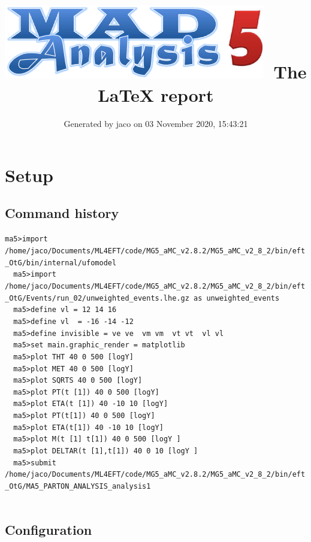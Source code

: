 \documentclass[a4paper, 10pt]{article}
\title{{\includegraphics[scale=.4]{logo.png}}\ The LaTeX report}
\author{Generated by jaco on 03 November 2020, 15:43:21}
\begin{document}
\maketitle
\flushbottom

\newpage
\section{ Setup}

\subsection{ Command history}

\texttt{ma5>import /\-home/\-jaco/\-Documents/\-ML4EFT/\-code/\-MG5\_aMC\_v2.8.2/\-MG5\_aMC\_v2\_8\_2/\-bin/\-eft\_OtG/\-bin/\-internal/\-ufomodel\\
}
\texttt{ }\texttt{ }\texttt{ma5>import /\-home/\-jaco/\-Documents/\-ML4EFT/\-code/\-MG5\_aMC\_v2.8.2/\-MG5\_aMC\_v2\_8\_2/\-bin/\-eft\_OtG/\-Events/\-run\_02/\-unweighted\_events.lhe.gz as unweighted\_events\\
}
\texttt{ }\texttt{ }\texttt{ma5>define vl = 12 14 16\\
}
\texttt{ }\texttt{ }\texttt{ma5>define vl~ = -16 -14 -12\\
}
\texttt{ }\texttt{ }\texttt{ma5>define invisible = ve ve~ vm vm~ vt vt~ vl vl~\\
}
\texttt{ }\texttt{ }\texttt{ma5>set main.graphic\_render = matplotlib\\
}
\texttt{ }\texttt{ }\texttt{ma5>plot THT   40 0 500 [logY]\\
}
\texttt{ }\texttt{ }\texttt{ma5>plot MET   40 0 500 [logY]\\
}
\texttt{ }\texttt{ }\texttt{ma5>plot SQRTS 40 0 500 [logY]\\
}
\texttt{ }\texttt{ }\texttt{ma5>plot  PT(t~[1]) 40 0  500 [logY]\\
}
\texttt{ }\texttt{ }\texttt{ma5>plot ETA(t~[1]) 40 -10 10 [logY]\\
}
\texttt{ }\texttt{ }\texttt{ma5>plot  PT(t[1]) 40 0  500 [logY]\\
}
\texttt{ }\texttt{ }\texttt{ma5>plot ETA(t[1]) 40 -10 10 [logY]\\
}
\texttt{ }\texttt{ }\texttt{ma5>plot M(t~[1] t[1]) 40 0  500 [logY ]\\
}
\texttt{ }\texttt{ }\texttt{ma5>plot DELTAR(t~[1],t[1]) 40 0 10 [logY ]\\
}
\texttt{ }\texttt{ }\texttt{ma5>submit /\-home/\-jaco/\-Documents/\-ML4EFT/\-code/\-MG5\_aMC\_v2.8.2/\-MG5\_aMC\_v2\_8\_2/\-bin/\-eft\_OtG/\-MA5\_PARTON\_ANALYSIS\_analysis1\\
}
\texttt{ }\texttt{ }\subsection{ Configuration}
\end{document}
